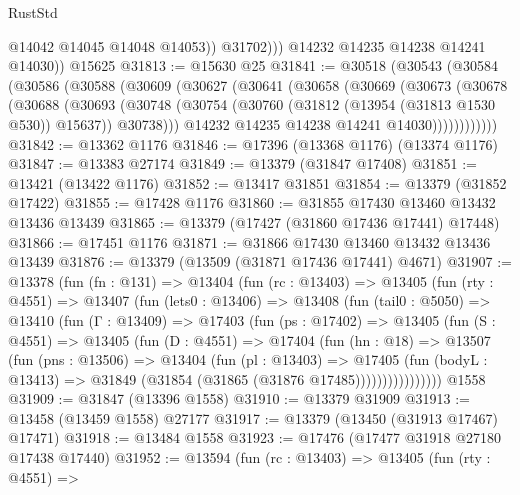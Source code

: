 \begin{lexlean}{RustStd}
\begin{coremodule}
                  @14042
                  @14045
                  @14048
                  @14053))
              @31702)))
        @14232
        @14235
        @14238
        @14241
        @14030))
    @15625
@31813 := @15630 @25
@31841 := @30518
    (@30543
      (@30584
        (@30586
          (@30588
            (@30609
              (@30627
                (@30641
                  (@30658
                    (@30669
                      (@30673
                        (@30678
                          (@30688
                            (@30693
                              (@30748
                                (@30754
                                  (@30760 (@31812 (@13954 (@31813 @1530 @530)) @15637))
                                  @30738)))
                            @14232
                            @14235
                            @14238
                            @14241
                            @14030))))))))))))
@31842 := @13362 @1176
@31846 := @17396 (@13368 @1176) (@13374 @1176)
@31847 := @13383 @27174
@31849 := @13379 (@31847 @17408)
@31851 := @13421 (@13422 @1176)
@31852 := @13417 @31851
@31854 := @13379 (@31852 @17422)
@31855 := @17428 @1176
@31860 := @31855 @17430 @13460 @13432 @13436 @13439
@31865 := @13379 (@17427 (@31860 @17436 @17441) @17448)
@31866 := @17451 @1176
@31871 := @31866 @17430 @13460 @13432 @13436 @13439
@31876 := @13379 (@13509 (@31871 @17436 @17441) @4671)
@31907 := @13378
    (fun (fn : @131) =>
    @13404
      (fun (rc : @13403) =>
      @13405
        (fun (rty : @4551) =>
        @13407
          (fun (lets0 : @13406) =>
          @13408
            (fun (tail0 : @5050) =>
            @13410
              (fun (Γ : @13409) =>
              @17403
                (fun (ps : @17402) =>
                @13405
                  (fun (S : @4551) =>
                  @13405
                    (fun (D : @4551) =>
                    @17404
                      (fun (hn : @18) =>
                      @13507
                        (fun (pns : @13506) =>
                        @13404
                          (fun (pl : @13403) =>
                          @17405
                            (fun (bodyL : @13413) =>
                            @31849 (@31854 (@31865 (@31876 @17485))))))))))))))))
    @1558
@31909 := @31847 (@13396 @1558)
@31910 := @13379 @31909
@31913 := @13458 (@13459 @1558) @27177
@31917 := @13379 (@13450 (@31913 @17467) @17471)
@31918 := @13484 @1558
@31923 := @17476 (@17477 @31918 @27180 @17438 @17440)
@31952 := @13594
    (fun (rc : @13403) =>
    @13405
      (fun (rty : @4551) =>

\end{coremodule}
\end{lexlean}
